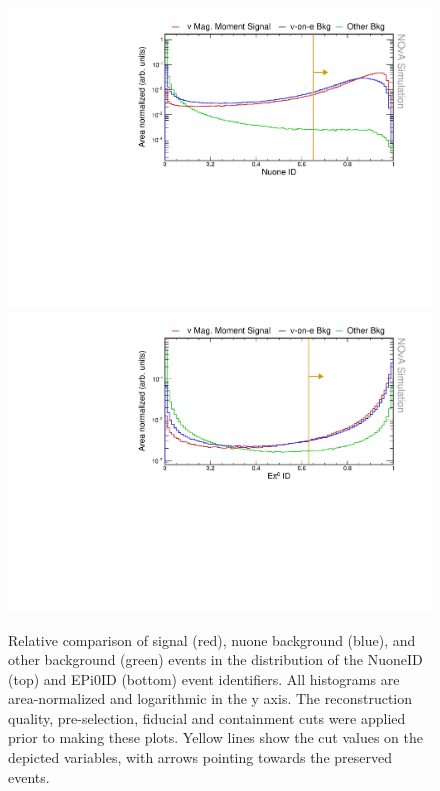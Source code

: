 \begin{figure}[hbtp]
\centering
\includegraphics[width=.9\textwidth]{Plots/NuMMEventSelection/LogY_N1Cut_nuoneidPre.pdf}
\includegraphics[width=.9\textwidth]{Plots/NuMMEventSelection/LogY_N1Cut_epi0idPre.pdf}
\caption[NuoneID and EPi0ID cuts]{Relative comparison of signal (red), \acrshort{nuone} background (blue), and other background (green) events in the distribution of the NuoneID (top) and EPi0ID (bottom) event identifiers. All histograms are area-normalized and logarithmic in the y axis. The reconstruction quality, pre-selection, fiducial and containment cuts were applied prior to making these plots. Yellow lines show the cut values on the depicted variables, with arrows pointing towards the preserved events.}
\label{fig:NuMMCutsTMVA3}
\end{figure}

